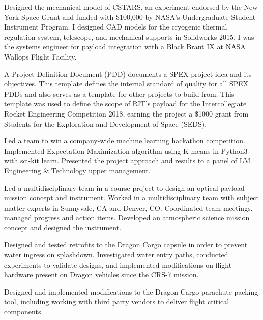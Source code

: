 \documentclass[10pt,final,sans]{resume}
\begin{document}
{
Designed the mechanical model of CSTARS, an experiment endorsed by the New York Space Grant and funded with \$100,000 by NASA's Undergraduate Student Instrument Program. I designed CAD models for the cryogenic thermal regulation system, telescope, and mechanical supports in Solidworks 2015. I was the systems engineer for payload integration with a Black Brant IX at NASA Wallops Flight Facility.

A Project Definition Document (PDD) documents a SPEX project idea and its objectives. This template defines the internal standard of quality for all SPEX PDDs and also serves as a template for other projects to build from. This template was used to define the scope of RIT's payload for the Intercollegiate Rocket Engineering Competition 2018, earning the project a \$1000 grant from Students for the Exploration and Development of Space (SEDS).

Led a team to win a company-wide machine learning hackathon competition. Implemented Expectation Maximization algorithm using K-means in Python3 with sci-kit learn. Presented the project approach and results to a panel of LM Engineering \& Technology upper management. 

Led a multidisciplinary team in a course project to design an optical payload mission concept and instrument. Worked in a multidisciplinary team with subject matter experts in Sunnyvale, CA and Denver, CO. Coordinated team meetings, managed progress and action items. Developed an atmospheric science mission concept and designed the instrument.

Designed and tested retrofits to the Dragon Cargo capsule in order to prevent water ingress on splashdown. Investigated water entry paths, conducted experiments to validate designs, and implemented modifications on flight hardware present on Dragon vehicles since the CRS-7 mission.

Designed and implemented modifications to the Dragon Cargo parachute packing tool, including working with third party vendors to deliver flight critical components.

}
\end{document}
